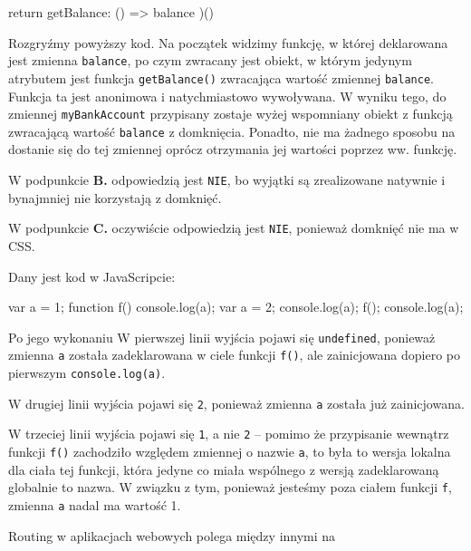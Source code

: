 \begin{solutions}
\begin{js}
{          return {
            getBalance: () => balance
          }
        })()
    \end{js}
    Rozgryźmy powyższy kod. Na początek widzimy funkcję, w której deklarowana jest zmienna \texttt{balance}, po czym zwracany jest obiekt, w którym jedynym atrybutem jest funkcja \texttt{getBalance()} zwracająca wartość zmiennej \texttt{balance}. Funkcja ta jest anonimowa i natychmiastowo wywoływana. W wyniku tego, do zmiennej \texttt{myBankAccount} przypisany zostaje wyżej wspomniany obiekt z funkcją zwracającą wartość \texttt{balance} z domknięcia. Ponadto, nie ma żadnego sposobu na dostanie się do tej zmiennej oprócz otrzymania jej wartości poprzez ww. funkcję.
    
    W podpunkcie \textbf{B.} odpowiedzią jest \texttt{NIE}, bo wyjątki są zrealizowane natywnie i bynajmniej nie korzystają z domknięć.
    
    W podpunkcie \textbf{C.} oczywiście odpowiedzią jest \texttt{NIE}, ponieważ domknięć nie ma w CSS.

    \sol Dany jest kod w JavaScripcie:
    \begin{js}
        var a = 1;
        function f() {
            console.log(a);
            var a = 2;
            console.log(a);
        }
        f();
        console.log(a);
    \end{js}
    Po jego wykonaniu
    W pierwszej linii wyjścia pojawi się \texttt{undefined}, ponieważ zmienna \texttt{a} została zadeklarowana w ciele funkcji \texttt{f()}, ale zainicjowana dopiero po pierwszym \texttt{console.log(a)}.
    
    W drugiej linii wyjścia pojawi się \texttt{2}, ponieważ zmienna \texttt{a} została już zainicjowana.
    
    W trzeciej linii wyjścia pojawi się \texttt{1}, a nie \texttt{2} -- pomimo że przypisanie wewnątrz funkcji \texttt{f()} zachodziło względem zmiennej o nazwie \texttt{a}, to była to wersja lokalna dla ciała tej funkcji, która jedyne co miała wspólnego z wersją zadeklarowaną globalnie to nazwa. W związku z tym, ponieważ jesteśmy poza ciałem funkcji \texttt{f}, zmienna \texttt{a} nadal ma wartość 1.

    \sol Routing w aplikacjach webowych polega między innymi na
    

\end{solutions}
